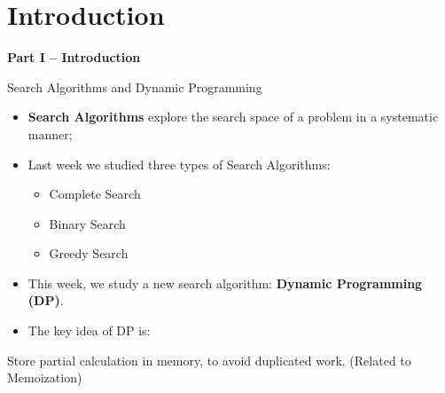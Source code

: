 \section{Introduction}

\begin{frame}
  \begin{center}
    {\bf Part I -- Introduction}
  \end{center}
\end{frame}

\begin{frame}{Search Algorithms and Dynamic Programming}

  \begin{itemize}
  \item {\bf Search Algorithms} explore the search space of a problem in a systematic manner;\bigskip

  \item Last week we studied three types of Search Algorithms:
    \begin{itemize}
    \item Complete Search
    \item Binary Search
    \item Greedy Search
    \end{itemize}
  \bigskip

  \item This week, we study a new search algorithm: {\bf Dynamic Programming (DP)}.
  \bigskip

  \item The key idea of DP is:
  \end{itemize}

  \begin{block}{}
    Store partial calculation in memory, to avoid duplicated work. (Related to Memoization)
  \end{block}
\end{frame}

